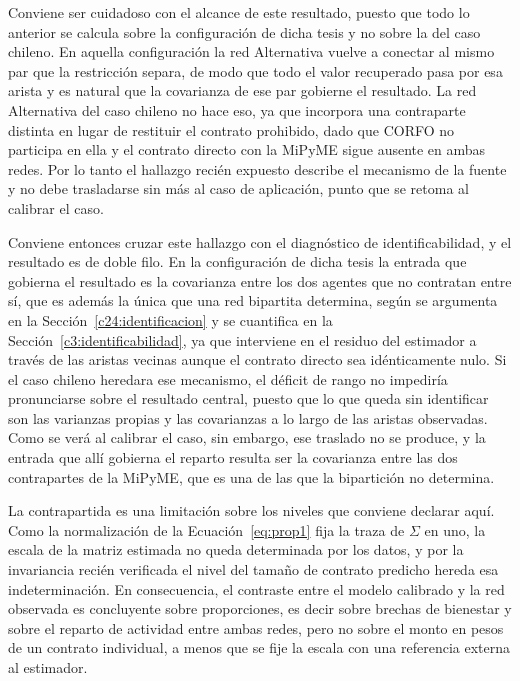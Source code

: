 Conviene ser cuidadoso con el alcance de este resultado, puesto que todo lo
anterior se calcula sobre la configuración de dicha tesis y no sobre la del caso
chileno. En aquella configuración la red Alternativa vuelve a conectar al mismo
par que la restricción separa, de modo que todo el valor recuperado pasa por esa
arista y es natural que la covarianza de ese par gobierne el resultado. La red
Alternativa del caso chileno no hace eso, ya que incorpora una contraparte
distinta en lugar de restituir el contrato prohibido, dado que CORFO no
participa en ella y el contrato directo con la MiPyME sigue ausente en ambas
redes. Por lo tanto el hallazgo recién expuesto describe el mecanismo de la
fuente y no debe trasladarse sin más al caso de aplicación, punto que se retoma
al calibrar el caso.

Conviene entonces cruzar este hallazgo con el diagnóstico de identificabilidad, y el resultado es de doble filo. En la configuración de dicha tesis la entrada que gobierna el resultado es la covarianza entre los dos agentes que no contratan entre sí, que es además la única que una red bipartita determina, según se argumenta en la Sección~\ref{c24:identificacion} y se cuantifica en la Sección~\ref{c3:identificabilidad}, ya que interviene en el residuo del estimador a través de las aristas vecinas aunque el contrato directo sea idénticamente nulo. Si el caso chileno heredara ese mecanismo, el déficit de rango no impediría pronunciarse sobre el resultado central, puesto que lo que queda sin identificar son las varianzas propias y las covarianzas a lo largo de las aristas observadas. Como se verá al calibrar el caso, sin embargo, ese traslado no se produce, y la entrada que allí gobierna el reparto resulta ser la covarianza entre las dos contrapartes de la MiPyME, que es una de las que la bipartición no determina.

La contrapartida es una limitación sobre los niveles que conviene declarar aquí. Como la normalización de la Ecuación~\eqref{eq:prop1} fija la traza de $\Sigma$ en uno, la escala de la matriz estimada no queda determinada por los datos, y por la invariancia recién verificada el nivel del tamaño de contrato predicho hereda esa indeterminación. En consecuencia, el contraste entre el modelo calibrado y la red observada es concluyente sobre proporciones, es decir sobre brechas de bienestar y sobre el reparto de actividad entre ambas redes, pero no sobre el monto en pesos de un contrato individual, a menos que se fije la escala con una referencia externa al estimador.

